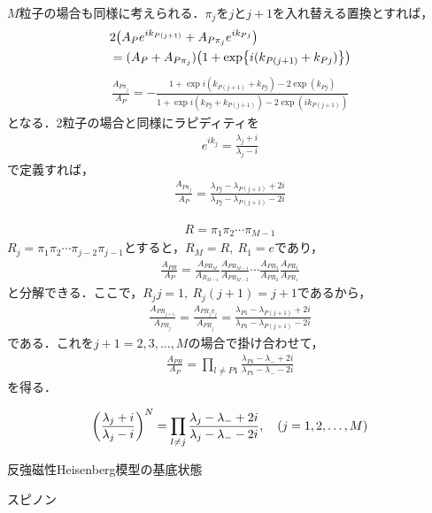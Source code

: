 \documentclass[dvipdfmx,9pt]{beamer}
\numberwithin{equation}{section}
\begin{document}
\begin{frame}
    $M$粒子の場合も同様に考えられる．$\pi_j$を$j$と$j+1$を入れ替える置換とすれば，
    \begin{align}
        &\nonumber
        2\qty(A_P e^{ik_{P(j+1)}}+A_{P\pi_j}e^{ik_{Pj}})
        \\ &
        = (A_P+A_{P\pi_j})\qty(1+\exp{i(k_{P(j+1)}+k_{Pj})})
    \end{align}
    \begin{align}
        \frac{A_{P\pi_j}}{A_P} = -\frac{1+\exp{i(k_{P(j+1)}+k_{Pj})}-2\exp(k_{Pj})}{1+\exp{i(k_{Pj}+k_{P(j+1)})}-2\exp(ik_{P(j+1)})}
    \end{align}
    となる．2粒子の場合と同様にラピディティを
    \begin{align}
        e^{ik_j} = \frac{\lambda_j + i}{\lambda_j - i}
    \end{align}
    で定義すれば，
    \begin{align}
        \frac{A_{P\pi_j}}{A_P} = \frac{\lambda_{Pj}-\lambda_{P(j+1)}+2i}{\lambda_{Pj}-\lambda_{P(j+1)}-2i}
    \end{align}
\end{frame}
\begin{frame}
    \begin{align}
        R = \pi_1 \pi_2 \cdots \pi_{M-1}
    \end{align}
    $R_j = \pi_1 \pi_2 \cdots \pi_{j-2}\pi_{j-1}$とすると，$R_{M} = R,~ R_1 = e$であり，
    \begin{align}
        \frac{A_{PR}}{A_P}
        = \frac{A_{PR_M}}{A_{R_{M-1}}}
        \frac{A_{PR_{M-1}}}{A_{PR_{M-2}}} \cdots \frac{A_{PR_3}}{A_{PR_2}} \frac{A_{PR_2}}{A_{PR_1}}
    \end{align}
    と分解できる．ここで，$R_j j = 1,~R_j(j+1) = j+1$であるから，
    \begin{align}
        \frac{A_{PR_{j+1}}}{A_{PR_j}} = \frac{A_{PR_j \pi_j}}{A_{PR_j}} = \frac{\lambda_{P1}-\lambda_{P(j+1)}+2i}{\lambda_{P1}-\lambda_{P(j+1)}-2i}
    \end{align}
    である．これを$j+1 = 2,3,\ldots,M$の場合で掛け合わせて，
    \begin{align}
        \frac{A_{PR}}{A_P} = \prod_{l \ne P1}\frac{\lambda_{P1}-\lambda_-+2i}{\lambda_{P1}-\lambda_--2i}
    \end{align}
    を得る．
\end{frame}

\begin{frame}
    \begin{align}
        \qty(\frac{\lambda_j + i}{\lambda_j - i})^N = \prod_{l \ne j}\frac{\lambda_{j}-\lambda_-+2i}{\lambda_{j}-\lambda_--2i},
        \quad
        (j = 1,2,\ldots,M)
    \end{align}
\end{frame}

\begin{frame}{反強磁性Heisenberg模型の基底状態}
    
\end{frame}

\begin{frame}{スピノン}
    
\end{frame}
\end{document}
